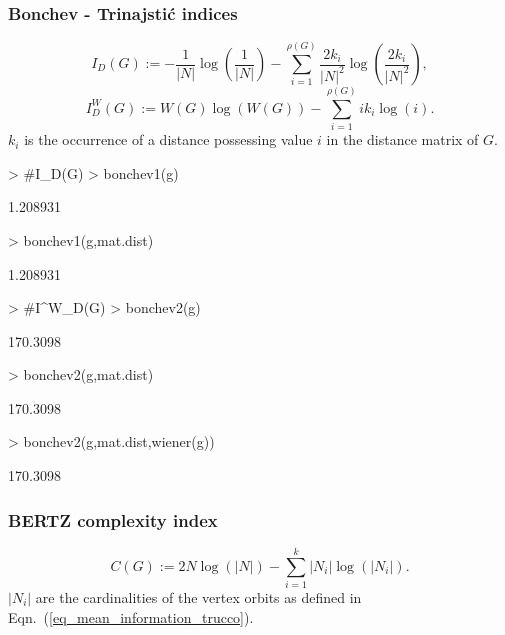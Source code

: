 \documentclass[a4paper]{article}
\begin{document}
\subsubsection*{Bonchev - Trinajsti\'{c} indices}
\begin{equation}
I_D(G) := - \frac{1}{|N|}\log\left( \frac{1}{|N|} \right)- \sum_{i=1}^{\rho(G)} \frac{2k_i}{|N|^2}\log\left( \frac{2k_i}{|N|^2} \right), \label{eq_mean_information_bonchev}
\end{equation}
\begin{equation}
I^W_D(G) := W(G) \log(W(G)) -  \sum_{i=1}^{\rho(G)} i k_i \log(i).
\end{equation}
%
$k_i$ is the occurrence of a distance possessing value $i$ in the distance matrix of $G$.
\begin{Schunk}
\begin{Sinput}
> #I_D(G)
> bonchev1(g)
\end{Sinput}
\begin{Soutput}
[1] 1.208931
\end{Soutput}
\begin{Sinput}
> bonchev1(g,mat.dist)
\end{Sinput}
\begin{Soutput}
[1] 1.208931
\end{Soutput}
\begin{Sinput}
> #I^W_D(G)
> bonchev2(g)
\end{Sinput}
\begin{Soutput}
[1] 170.3098
\end{Soutput}
\begin{Sinput}
> bonchev2(g,mat.dist)
\end{Sinput}
\begin{Soutput}
[1] 170.3098
\end{Soutput}
\begin{Sinput}
> bonchev2(g,mat.dist,wiener(g))
\end{Sinput}
\begin{Soutput}
[1] 170.3098
\end{Soutput}
\end{Schunk}
\subsubsection*{BERTZ complexity index}
\begin{equation}\label{eq_total_information_bertz}
C(G):= 2N \log(|N|) - \sum_{i=1}^{k} |N_i| \log \left( |N_i| \right).
\end{equation}
%
$|N_i|$ are the cardinalities of the vertex orbits as defined in Eqn.~(\ref{eq_mean_information_trucco}).
\end{document}
